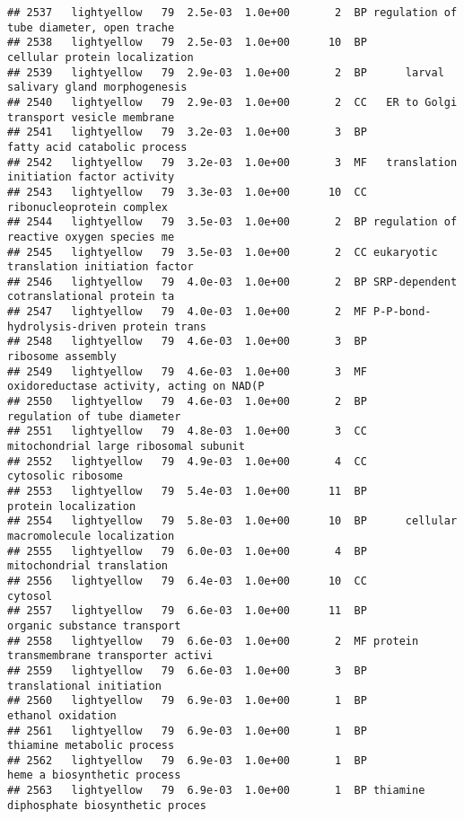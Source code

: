 \documentclass[]{article}
\begin{document}
\begin{verbatim}
## 2537   lightyellow   79  2.5e-03  1.0e+00       2  BP regulation of tube diameter, open trache
## 2538   lightyellow   79  2.5e-03  1.0e+00      10  BP            cellular protein localization
## 2539   lightyellow   79  2.9e-03  1.0e+00       2  BP      larval salivary gland morphogenesis
## 2540   lightyellow   79  2.9e-03  1.0e+00       2  CC   ER to Golgi transport vesicle membrane
## 2541   lightyellow   79  3.2e-03  1.0e+00       3  BP             fatty acid catabolic process
## 2542   lightyellow   79  3.2e-03  1.0e+00       3  MF   translation initiation factor activity
## 2543   lightyellow   79  3.3e-03  1.0e+00      10  CC                ribonucleoprotein complex
## 2544   lightyellow   79  3.5e-03  1.0e+00       2  BP regulation of reactive oxygen species me
## 2545   lightyellow   79  3.5e-03  1.0e+00       2  CC eukaryotic translation initiation factor
## 2546   lightyellow   79  4.0e-03  1.0e+00       2  BP SRP-dependent cotranslational protein ta
## 2547   lightyellow   79  4.0e-03  1.0e+00       2  MF P-P-bond-hydrolysis-driven protein trans
## 2548   lightyellow   79  4.6e-03  1.0e+00       3  BP                        ribosome assembly
## 2549   lightyellow   79  4.6e-03  1.0e+00       3  MF oxidoreductase activity, acting on NAD(P
## 2550   lightyellow   79  4.6e-03  1.0e+00       2  BP              regulation of tube diameter
## 2551   lightyellow   79  4.8e-03  1.0e+00       3  CC    mitochondrial large ribosomal subunit
## 2552   lightyellow   79  4.9e-03  1.0e+00       4  CC                       cytosolic ribosome
## 2553   lightyellow   79  5.4e-03  1.0e+00      11  BP                     protein localization
## 2554   lightyellow   79  5.8e-03  1.0e+00      10  BP      cellular macromolecule localization
## 2555   lightyellow   79  6.0e-03  1.0e+00       4  BP                mitochondrial translation
## 2556   lightyellow   79  6.4e-03  1.0e+00      10  CC                                  cytosol
## 2557   lightyellow   79  6.6e-03  1.0e+00      11  BP              organic substance transport
## 2558   lightyellow   79  6.6e-03  1.0e+00       2  MF protein transmembrane transporter activi
## 2559   lightyellow   79  6.6e-03  1.0e+00       3  BP                 translational initiation
## 2560   lightyellow   79  6.9e-03  1.0e+00       1  BP                        ethanol oxidation
## 2561   lightyellow   79  6.9e-03  1.0e+00       1  BP               thiamine metabolic process
## 2562   lightyellow   79  6.9e-03  1.0e+00       1  BP              heme a biosynthetic process
## 2563   lightyellow   79  6.9e-03  1.0e+00       1  BP thiamine diphosphate biosynthetic proces

\end{verbatim}
\end{document}
